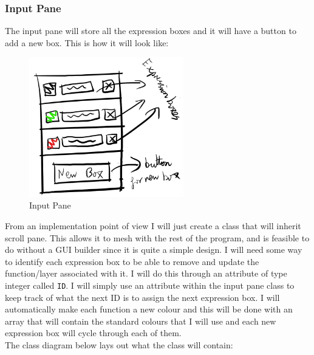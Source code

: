 \documentclass[../../../../main.tex]{subfiles}
\begin{document}
\subsubsection{Input Pane}
The input pane will store all the expression boxes and it will have a button to add a new box. This is how it will look like:
\begin{figure}[H]
	\centering
	\includegraphics[width=0.6\textwidth]{images/inputPane}
	\caption{Input Pane}
\end{figure}
From an implementation point of view I will just create a class that will inherit scroll pane. This allows it to mesh with the rest of the program, and is feasible to do without a GUI builder since it is quite a simple design. I will need some way to identify each expression box to be able to remove and update the function/layer associated with it. I will do this through an attribute of type integer called \texttt{ID}. I will simply use an attribute within the input pane class to keep track of what the next ID is to assign the next expression box. I will automatically make each function a new colour and this will be done with an array that will contain the standard colours that I will use and each new expression box will cycle through each of them.\\
The class diagram below lays out what the class will contain:
\newpage
\end{document}
